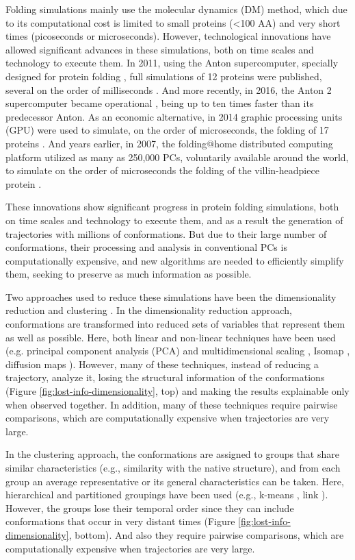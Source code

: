 \documentclass[american,twocolumn]{bmcart}
\begin{document}
Folding simulations mainly use the molecular dynamics (DM) method, which due to its computational cost is limited to small proteins (<100 AA) and very short times (picoseconds or microseconds). However, technological innovations have allowed significant advances in these simulations, both on time scales and technology to execute them. In 2011, using the Anton supercomputer, specially designed for protein folding \cite{Shaw2008}, full simulations of 12 proteins were published, several on the order of milliseconds \cite{Shaw2011}. And more recently, in 2016, the Anton 2 supercomputer became operational \cite{Shaw2014}, being up to ten times faster than its predecessor Anton. As an economic alternative, in 2014 graphic processing units (GPU) were used to simulate, on the order of microseconds, the folding of 17 proteins \cite{Nguyen2014}. And years earlier, in 2007, the \textquotedbl{}folding@home\textquotedbl{} distributed computing platform utilized as many as 250,000 PCs, voluntarily available around the world, to simulate on the order of microseconds the folding of the villin-headpiece protein \cite{Larson2009}.

These innovations show significant progress in protein folding simulations, both on time scales and technology to execute them, and as a result the generation of trajectories with millions of conformations. But due to their large number of conformations, their processing and analysis in conventional PCs is computationally expensive, and new algorithms are needed to efficiently simplify them, seeking to preserve as much information as possible.

Two approaches used to reduce these simulations have been the dimensionality reduction \cite{Duan2013} and clustering \cite{Peng2018}. In the dimensionality reduction approach, conformations are transformed into reduced sets of variables that represent them as well as possible. Here, both linear and non-linear techniques have been used (e.g. principal component analysis (PCA) and multidimensional scaling \cite{RajanSchulten10}, Isomap \cite{Das2006}, diffusion maps \cite{Kim2015}). However, many of these techniques, instead of reducing a trajectory, analyze it, losing the structural information of the conformations (Figure \ref{fig:lost-info-dimensionality}, top) and making the results explainable only when observed together. In addition, many of these techniques require pairwise comparisons, which are computationally expensive when trajectories are very large.

In the clustering approach, the conformations are assigned to groups that share similar characteristics (e.g., similarity with the native structure), and from each group an average representative or its general characteristics can be taken. Here, hierarchical and partitioned groupings have been used (e.g., k-means \cite{Doerr2017}, link \cite{Shao2007}). However, the groups lose their temporal order since they can include conformations that occur in very distant times (Figure \ref{fig:lost-info-dimensionality}, bottom). And also they require pairwise comparisons, which are computationally expensive when trajectories are very large.
\end{document}
